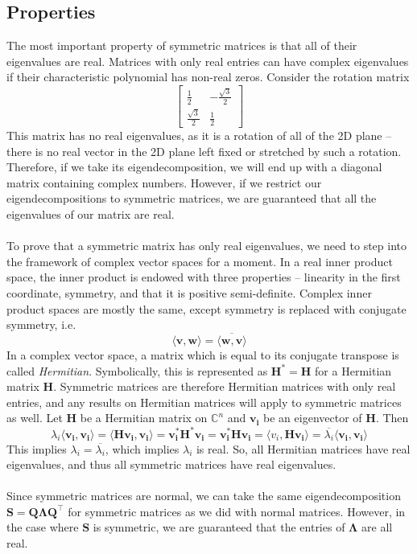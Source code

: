 \documentclass{article}
\begin{document}
\subsection{Properties}
The most important property of symmetric matrices is that all of their eigenvalues are real. Matrices with only real entries can have complex eigenvalues if their characteristic polynomial has non-real zeros. Consider the rotation matrix $$\begin{bmatrix} \frac{1}{2} & -\frac{\sqrt{3}}{2} \\ \frac{\sqrt{3}}{2} & \frac{1}{2} \end{bmatrix}$$ This matrix has no real eigenvalues, as it is a rotation of all of the 2D plane -- there is no real vector in the 2D plane left fixed or stretched by such a rotation. Therefore, if we take its eigendecomposition, we will end up with a diagonal matrix containing complex numbers. However, if we restrict our eigendecompositions to symmetric matrices, we are guaranteed that all the eigenvalues of our matrix are real. \\\\
To prove that a symmetric matrix has only real eigenvalues, we need to step into the framework of complex vector spaces for a moment. In a real inner product space, the inner product is endowed with three properties -- linearity in the first coordinate, symmetry, and that it is positive semi-definite. Complex inner product spaces are mostly the same, except symmetry is replaced with conjugate symmetry, i.e. $$\langle \mathbf{v, w} \rangle = \overline{\langle \mathbf{w, v} \rangle}$$ In a complex vector space, a matrix which is equal to its conjugate transpose is called \textit{Hermitian}. Symbolically, this is represented as $\mathbf{H}^* = \mathbf{H}$ for a Hermitian matrix $\mathbf{H}$. Symmetric matrices are therefore Hermitian matrices with only real entries, and any results on Hermitian matrices will apply to symmetric matrices as well. Let $\mathbf{H}$ be a Hermitian matrix on $\mathbb{C}^n$ and $\mathbf{v_i}$ be an eigenvector of $\mathbf{H}$. Then $$\lambda_i\langle \mathbf{v_i, v_i} \rangle = \langle \mathbf{Hv_i, v_i} \rangle = \mathbf{v_i^*H^*v_i} = \mathbf{v_i^*Hv_i} = \langle v_i, \mathbf{Hv_i} \rangle = \overline{\lambda_i}\langle \mathbf{v_i, v_i} \rangle$$ This implies $\lambda_i = \overline{\lambda_i}$, which implies $\lambda_i$ is real. So, all Hermitian matrices have real eigenvalues, and thus all symmetric matrices have real eigenvalues. \\\\
Since symmetric matrices are normal, we can take the same eigendecomposition $\mathbf{S} = \mathbf{Q\Lambda Q^{\top}}$ for symmetric matrices as we did with normal matrices. However, in the case where $\mathbf{S}$ is symmetric, we are guaranteed that the entries of $\mathbf{\Lambda}$ are all real.
\end{document}
